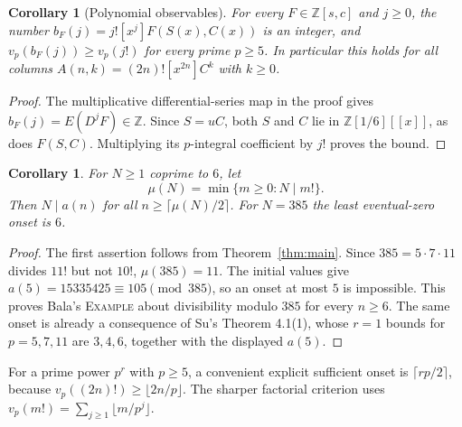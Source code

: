 \documentclass[11pt]{article}
\newtheorem{corollary}[theorem]{Corollary}
\newcommand{\Z}{\mathbb{Z}}
\newcommand{\coeff}[2]{[#1]#2}
\begin{document}
\begin{corollary}[Polynomial observables]\label{cor:polynomial}
For every $F\in\Z[s,c]$ and $j\geq0$, the number
$b_F(j)=j!\coeff{x^j}{F(S(x),C(x))}$ is an integer, and
$v_p(b_F(j))\geq v_p(j!)$ for every prime $p\geq5$.
In particular this holds for all columns
$A(n,k)=(2n)!\coeff{x^{2n}}{C^k}$ with $k\geq0$.
\end{corollary}
\begin{proof}
The multiplicative differential-series map in the proof gives
$b_F(j)=E(D^jF)\in\Z$. Since $S=uC$, both $S$ and $C$ lie in
$\Z[1/6][[x]]$, as does $F(S,C)$. Multiplying its $p$-integral
coefficient by $j!$ proves the bound.
\end{proof}

\begin{corollary}\label{cor:threshold}
For $N\geq1$ coprime to $6$, let
\[
\mu(N)=\min\{m\geq0:N\mid m!\}.
\]
Then $N\mid a(n)$ for all $n\geq\lceil\mu(N)/2\rceil$.
For $N=385$ the least eventual-zero onset is $6$.
\end{corollary}
\begin{proof}
The first assertion follows from Theorem~\ref{thm:main}.
Since $385=5\cdot7\cdot11$ divides $11!$ but not $10!$, $\mu(385)=11$.
The initial values give $a(5)=15335425\equiv105\pmod{385}$,
so an onset at most $5$ is impossible. This proves Bala's
\textsc{Example} about divisibility modulo $385$ for every $n\geq6$.
The same onset is already a consequence of Su's Theorem 4.1(1), whose
$r=1$ bounds for $p=5,7,11$ are $3,4,6$, together with the displayed $a(5)$.
\end{proof}
For a prime power $p^r$ with $p\geq5$, a convenient explicit sufficient onset is
$\lceil rp/2\rceil$, because $v_p((2n)!)\geq\lfloor2n/p\rfloor$.
The sharper factorial criterion uses
$v_p(m!)=\sum_{j\geq1}\lfloor m/p^j\rfloor$.
\end{document}
